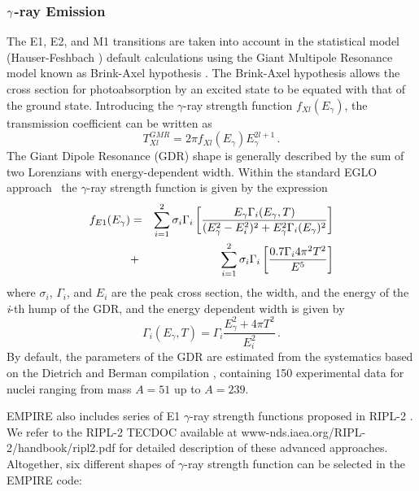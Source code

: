 \subsubsection{$\protect\gamma$-ray Emission}

The E1, E2, and M1 transitions are taken into account in the statistical
model (Hauser-Feshbach%
) default calculations using the Giant Multipole
Resonance model known as Brink-Axel hypothesis \cite{Axel,Brink,Brinka}. The
Brink-Axel hypothesis allows the cross section for photoabsorption by an
excited state to be equated with that of the ground state. Introducing the $%
\gamma$-ray strength function $f_{Xl}(E_{\gamma})$, the transmission
coefficient can be written as 
\begin{equation}
T_{Xl}^{GMR}=2\pi f_{Xl}(E_{\gamma})E_{\gamma}^{2l+1}\,.  \label{tgGMR}
\end{equation}
The Giant Dipole Resonance (GDR) shape is generally described by the sum of
two Lorenzians with energy-dependent width. Within the standard EGLO
approach~\cite{kop01} the $\gamma$-ray strength function is given by the
expression \noindent 
\begin{eqnarray}
f_{E1}(E_{\gamma})&=&\sum_{i=1}^{2}\sigma_{i}\Gamma_{i}\left[%
\frac{E_{\gamma}\Gamma_{i}(E_{\gamma},T)}{(E_{\gamma}^{2}-E_{i}^{2})^{2}+E_{%
\gamma}^{2}\Gamma_{i}(E_{\gamma})^{2}}\right]  \notag \\
&+&\sum_{i=1}^{2}\sigma_{i}\Gamma_{i}\left[\frac{0.7\Gamma_{i}4\pi^{2}T^{2}}{%
E^{5}}\right]  \label{lorenz}
\end{eqnarray}
\noindent where $\sigma_{i}$, $\Gamma_{i}$, and $E_{i}$ are the peak cross
section, the width, and the energy of the \emph{i}-th hump of the GDR, and
the energy dependent width is given by 
\begin{equation}
\Gamma_{i}(E_{\gamma},T)=\Gamma_{i}\frac{E_{\gamma}^{2}+4\pi T^{2}}{E_{i}^{2}%
}\,.
\end{equation}
By default, the parameters of the GDR are estimated from the systematics
based on the Dietrich and Berman compilation \cite{die88}, containing 150
experimental data for nuclei ranging from mass $A=51$ up to $A=239$.

EMPIRE also includes series of E1 $\gamma$-ray strength functions proposed
in RIPL-2 \cite{RIPL2}. We refer to the RIPL-2 TECDOC available at
www-nds.iaea.org/RIPL-2/handbook/ripl2.pdf for detailed description of these
advanced approaches. Altogether, six different shapes of $\gamma$-ray
strength function can be selected in the EMPIRE code:

